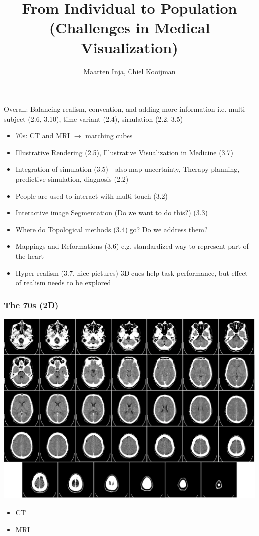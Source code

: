 \documentclass{beamer}
\title{From Individual to Population\\(Challenges in Medical Visualization)}
\author{Maarten Inja, Chiel Kooijman}
\begin{document}
\begin{frame}
	\maketitle
\end{frame}

\begin{frame}
	Overall: Balancing realism, convention, and adding more information i.e.
	multi-subject (2.6, 3.10), time-variant (2.4), simulation (2.2, 3.5)\\
	
	\begin{itemize}
		\item 70s: CT and MRI $\rightarrow$ marching cubes\\
		\item Illustrative Rendering (2.5), Illustrative Visualization in
			Medicine (3.7)\\
		\item Integration of simulation (3.5) - also map uncertainty, Therapy
			planning, predictive simulation, diagnosis (2.2)\\

		\item People are used to interact with multi-touch (3.2)\\

		\item Interactive image Segmentation (Do we want to do this?) (3.3)\\

		\item Where do Topological methods (3.4) go? Do we address them?

		\item Mappings and Reformations (3.6) e.g. standardized way to
			represent part of the heart\\

		\item Hyper-realism (3.7, nice pictures) 3D cues help task performance,
			but effect of realism needs to be explored
	\end{itemize}
\end{frame}

\begin{frame}
	\frametitle{The 70s (2D)}
	\begin{center}
		\includegraphics[width=.6\textwidth]{images/ct}
	\end{center}
	\begin{itemize}
		\item CT
		\item MRI
	\end{itemize}
\end{frame}
\end{document}
